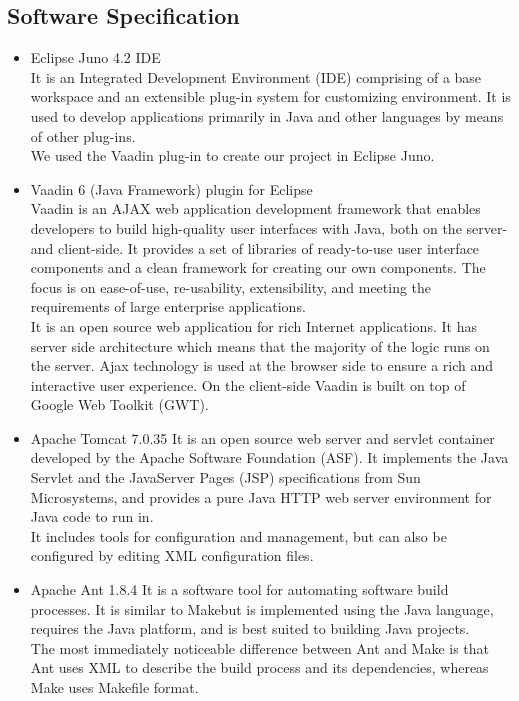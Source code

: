 \documentclass[amsart, 12pt]{article}
\begin{document}
\subsection{Software Specification}
\begin{itemize}
\item Eclipse Juno 4.2 IDE \\
It is an Integrated Development Environment (IDE) comprising of a base workspace and an extensible plug-in system for customizing environment. It is used to develop applications primarily in Java and other languages by means of other plug-ins.\\
We used the Vaadin plug-in to create our project in Eclipse Juno.

\item Vaadin 6 (Java Framework) plugin for Eclipse \\
Vaadin is an AJAX web application development framework that enables developers to build high-quality user interfaces with Java, both on the server- and client-side. It provides a set of libraries of ready-to-use user interface components and a clean framework for creating our own components. The focus is on ease-of-use, re-usability, extensibility, and meeting the requirements of large enterprise applications.\\
It is an open source web application for rich Internet applications. It has server side architecture which means that the majority of the logic runs on the server. Ajax technology is used at the browser side to ensure a rich and interactive user experience. On the client-side Vaadin is built on top of Google Web Toolkit (GWT).\\

\item Apache Tomcat 7.0.35
It is an open source web server and servlet container developed by the Apache Software Foundation (ASF). It implements the Java Servlet and the JavaServer Pages (JSP) specifications from Sun Microsystems, and provides a pure Java HTTP web server environment for Java code to run in. \\
It includes tools for configuration and management, but can also be configured by editing XML configuration files.

\item Apache Ant 1.8.4
It is a software tool for automating software build processes. It is similar to \textasciigrave Make\textasciiacute but is implemented using the Java language, requires the Java platform, and is best suited to building Java projects.\\
The most immediately noticeable difference between Ant and Make is that Ant uses XML to describe the build process and its dependencies, whereas Make uses Makefile format.


\end{itemize}
\end{document}
